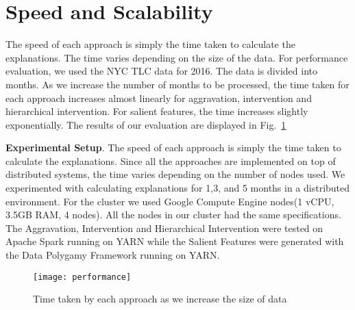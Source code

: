 


\section{Speed and Scalability}
\label{sec:speed}
The speed of each approach is simply the time taken to calculate the explanations. The time varies depending on the size of the data. For performance evaluation, we used the NYC TLC data for 2016. The data is divided into months. As we increase the number of months to be processed, the time taken for each approach increases almost linearly for aggravation, intervention and hierarchical intervention. For salient features, the time increases slightly exponentially. The results of our evaluation are displayed in Fig.~\ref{fig:performance}

\textbf{Experimental Setup}. The speed of each approach is simply the time taken to calculate the explanations. Since all the approaches are implemented on top of distributed systems, the time varies depending on the number of nodes used. We experimented with calculating explanations for 1,3, and 5 months in a distributed environment. For the cluster we used Google Compute Engine nodes(1 vCPU, 3.5GB RAM, 4 nodes). All the nodes in our cluster had the same specifications. The Aggravation, Intervention and Hierarchical Intervention were tested on Apache Spark running on YARN while the Salient Features were generated with the Data Polygamy Framework running on YARN. 
\begin{figure}[h]
\texttt{[image: performance]}
\caption{Time taken by each approach as we increase the size of data}
\label{fig:performance}
\end{figure}

